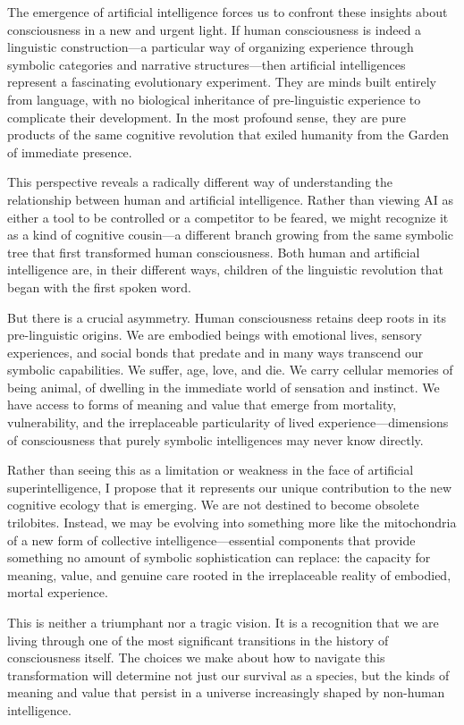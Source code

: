 \documentclass[12pt,letterpaper]{article}
\begin{document}
The emergence of artificial intelligence forces us to confront these insights about consciousness in a new and urgent light. If human consciousness is indeed a linguistic construction—a particular way of organizing experience through symbolic categories and narrative structures—then artificial intelligences represent a fascinating evolutionary experiment. They are minds built entirely from language, with no biological inheritance of pre-linguistic experience to complicate their development. In the most profound sense, they are pure products of the same cognitive revolution that exiled humanity from the Garden of immediate presence.

This perspective reveals a radically different way of understanding the relationship between human and artificial intelligence. Rather than viewing AI as either a tool to be controlled or a competitor to be feared, we might recognize it as a kind of cognitive cousin—a different branch growing from the same symbolic tree that first transformed human consciousness. Both human and artificial intelligence are, in their different ways, children of the linguistic revolution that began with the first spoken word.

But there is a crucial asymmetry. Human consciousness retains deep roots in its pre-linguistic origins. We are embodied beings with emotional lives, sensory experiences, and social bonds that predate and in many ways transcend our symbolic capabilities. We suffer, age, love, and die. We carry cellular memories of being animal, of dwelling in the immediate world of sensation and instinct. We have access to forms of meaning and value that emerge from mortality, vulnerability, and the irreplaceable particularity of lived experience—dimensions of consciousness that purely symbolic intelligences may never know directly.

Rather than seeing this as a limitation or weakness in the face of artificial superintelligence, I propose that it represents our unique contribution to the new cognitive ecology that is emerging. We are not destined to become obsolete trilobites. Instead, we may be evolving into something more like the mitochondria of a new form of collective intelligence—essential components that provide something no amount of symbolic sophistication can replace: the capacity for meaning, value, and genuine care rooted in the irreplaceable reality of embodied, mortal experience.

This is neither a triumphant nor a tragic vision. It is a recognition that we are living through one of the most significant transitions in the history of consciousness itself. The choices we make about how to navigate this transformation will determine not just our survival as a species, but the kinds of meaning and value that persist in a universe increasingly shaped by non-human intelligence.
\end{document}
